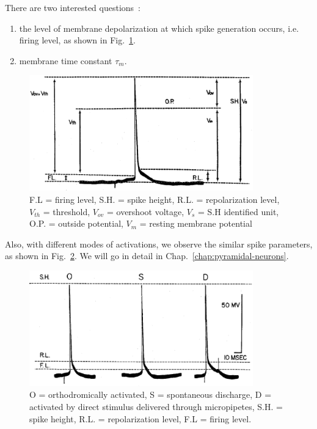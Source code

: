There are two interested questions~\cite{kandel1961ehn_c}:
\begin{enumerate}
\item the level of membrane depolarization at which spike generation
  occurs, i.e. firing level, as shown in Fig.~\ref{fig:firing_level}.
\item membrane time constant $\tau_m$.
\end{enumerate}

\begin{figure}[hbt]
  \centerline{\includegraphics[height=5cm,
    angle=0]{./images/firing_level.eps}}
  \caption{F.L = firing level, S.H. = spike height, R.L. =
    repolarization level, $V_{th}$ = threshold, $V_{ov}$ = overshoot
    voltage, $V_s$ = S.H identified unit, O.P. = outside potential,
    $V_m$ = resting membrane potential}
\label{fig:firing_level}
\end{figure}

Also, with different modes of activations, we observe the similar
spike parameters, as shown in Fig.~\ref{fig:stimulate_mode}.  We will
go in detail in Chap.~\ref{chap:pyramidal-neurons}. 

\begin{figure}[hbt]
  \centerline{\includegraphics[height=5cm,
    angle=0]{./images/stimulation_mode.eps}}
\caption{O = orthodromically activated, S = spontaneous discharge, D =
activated by direct stimulus delivered through micropipetes, S.H. =
spike height, R.L. = repolarization level, F.L = firing level. }
\label{fig:stimulate_mode}
\end{figure}



